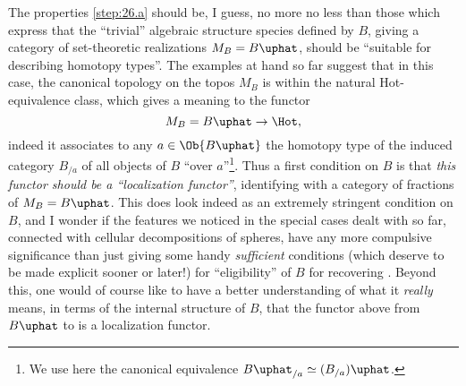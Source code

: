 The properties \ref{step:26.a} should be, I guess, no more no less
than those which express that the ``trivial'' algebraic structure
species defined by $B$, giving a category of set-theoretic
realizations $M_B=B\uphat$, should be ``suitable for describing
homotopy types''. The examples at hand so far suggest that in this
case, the canonical topology on the topos $M_B$ is within the natural
Hot-equivalence class, which gives a meaning to the functor
\[ M_B = B\uphat \to \Hot,\]
indeed it associates to any $a \in \Ob{B\uphat}$ the homotopy type
of the induced category $B_{/a}$ of all objects of $B$ ``over
$a$''\footnote{We use here the canonical equivalence $B\uphat_{/a} \simeq (B_{/a})\uphat$.}.
Thus a first condition on $B$ is that \emph{this functor should be a
``localization functor''}, identifying \Hot{} with a category of
fractions of $M_B = B\uphat$. This does look indeed as an extremely
stringent condition on $B$, and I wonder if the features we noticed in
the special cases dealt with so far, connected with cellular
decompositions of spheres, have any more compulsive significance than
just giving some handy \emph{sufficient} conditions (which deserve to
be made explicit sooner or later!) for ``eligibility'' of $B$ for
recovering \Hot{}. Beyond this, one would of course like to have a
better understanding of what it \emph{really} means, in terms of the internal
structure of $B$, that the functor above from $B\uphat$ to \Hot{} is
a localization functor.

